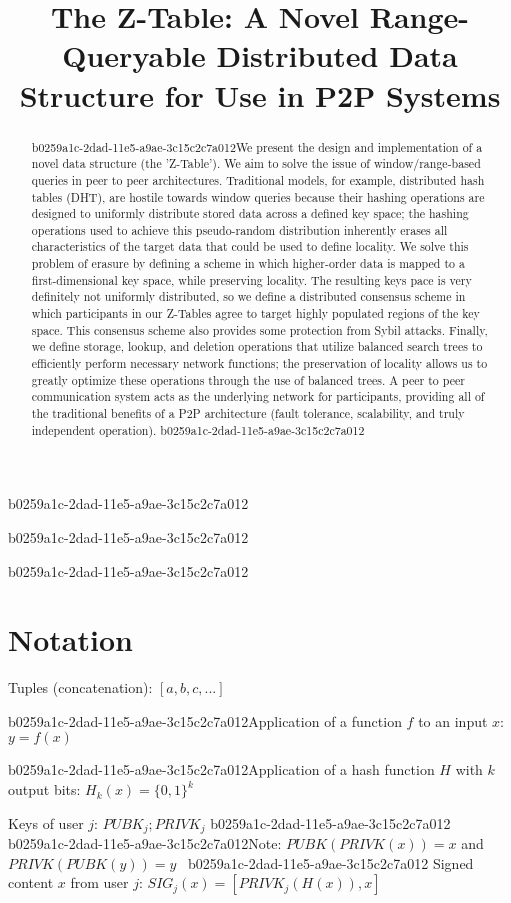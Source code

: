 \documentclass[12pt]{article}
\title{The Z-Table: A Novel Range-Queryable Distributed Data Structure for Use in P2P Systems}
\begin{document}
b0259a1c-2dad-11e5-a9ae-3c15c2c7a012\maketitle

b0259a1c-2dad-11e5-a9ae-3c15c2c7a012\begin{abstract}
b0259a1c-2dad-11e5-a9ae-3c15c2c7a012We present the design and implementation of a novel data structure (the 'Z-Table'). We aim to solve the issue of window/range-based queries in peer to peer architectures. Traditional models, for example,  distributed hash tables (DHT), are hostile towards window queries because their hashing operations are designed to uniformly distribute stored data across a defined key space; the hashing operations used to achieve this pseudo-random distribution inherently erases all characteristics of the target data that could be used to define locality. We solve this problem of erasure by defining a scheme in which higher-order data is mapped to a first-dimensional key space, while preserving locality. The resulting keys pace is very definitely not uniformly distributed, so we define a distributed consensus scheme in which participants in our Z-Tables agree to target highly populated regions of the key space. This consensus scheme also provides some protection from Sybil attacks. Finally, we define storage, lookup, and deletion operations that utilize balanced search trees to efficiently perform necessary network functions; the preservation of locality allows us to greatly optimize these operations through the use of balanced trees. A peer to peer communication system acts as the underlying network for participants, providing all of the traditional benefits of a P2P architecture (fault tolerance, scalability, and truly independent operation).
b0259a1c-2dad-11e5-a9ae-3c15c2c7a012\end{abstract}
b0259a1c-2dad-11e5-a9ae-3c15c2c7a012
\section{Notation}

Tuples (concatenation): $[a,b,c,...]$

b0259a1c-2dad-11e5-a9ae-3c15c2c7a012Application of a function $f$ to an input $x$: $y=f(x)$

b0259a1c-2dad-11e5-a9ae-3c15c2c7a012Application of a hash function $H$ with $k$ output bits: $H_{k}(x) = \{0,1\}^k$

Keys of user $j$: $ PUBK_j; PRIVK_j $
b0259a1c-2dad-11e5-a9ae-3c15c2c7a012
b0259a1c-2dad-11e5-a9ae-3c15c2c7a012Note: $PUBK(PRIVK(x)) = x$ and $PRIVK(PUBK(y)) = y$~
b0259a1c-2dad-11e5-a9ae-3c15c2c7a012
Signed content $x$ from user $j$: $SIG_j(x) = \left[ PRIVK_j( H(x) ), x \right]$
\end{document}
